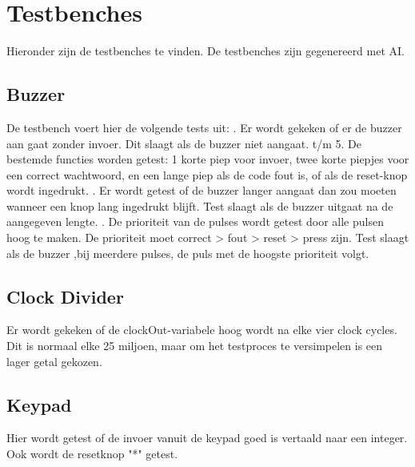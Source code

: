 \section{Testbenches}
Hieronder zijn de testbenches te vinden. De testbenches zijn gegenereerd met AI. 

\subsection{Buzzer}
De testbench voert hier de volgende tests uit: . Er wordt gekeken of er de buzzer aan gaat zonder invoer. Dit slaagt als de buzzer niet aangaat.  t/m 5. De bestemde functies worden getest: 1 korte piep voor invoer, twee korte piepjes voor een correct wachtwoord, en een lange piep als de code fout is, of als de reset-knop wordt ingedrukt. . Er wordt getest of de buzzer langer aangaat dan zou moeten wanneer een knop lang ingedrukt blijft. Test slaagt als de buzzer uitgaat na de aangegeven lengte. . De prioriteit van de pulses wordt getest door alle pulsen hoog te maken. De prioriteit moet correct > fout > reset > press zijn. Test slaagt als de buzzer ,bij meerdere pulses, de puls met de hoogste prioriteit volgt. \newline


\subsection{Clock Divider}
Er wordt gekeken of de clockOut-variabele hoog wordt na elke vier clock cycles. Dit is normaal elke 25 miljoen, maar om het testproces te versimpelen is een lager getal gekozen. \newline


\subsection{Keypad}
Hier wordt getest of de invoer vanuit de keypad goed is vertaald naar een integer. Ook wordt de resetknop "*" getest. \newline


